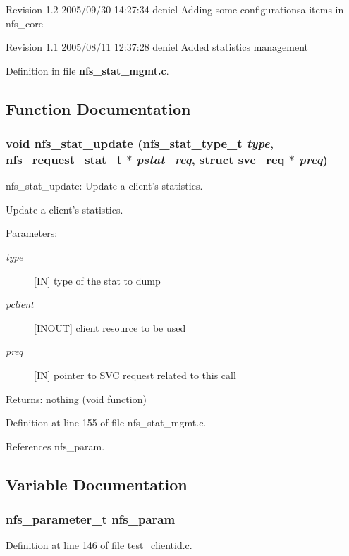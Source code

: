 Revision 1.2 2005/09/30 14:27:34 deniel Adding some configurationsa items in nfs\_\-core

Revision 1.1 2005/08/11 12:37:28 deniel Added statistics management

Definition in file {\bf nfs\_\-stat\_\-mgmt.c}.

\subsection{Function Documentation}
\subsubsection{\setlength{\rightskip}{0pt plus 5cm}void nfs\_\-stat\_\-update (nfs\_\-stat\_\-type\_\-t {\em type}, nfs\_\-request\_\-stat\_\-t $\ast$ {\em pstat\_\-req}, struct svc\_\-req $\ast$ {\em preq})}\label{nfs__stat__mgmt_8c_a1}


nfs\_\-stat\_\-update: Update a client's statistics.

Update a client's statistics.

\begin{Desc}
\item[Parameters:]
\begin{description}
\item[{\em type}][IN] type of the stat to dump \item[{\em pclient}][INOUT] client resource to be used \item[{\em preq}][IN] pointer to SVC request related to this call\end{description}
\end{Desc}
\begin{Desc}
\item[Returns:]nothing (void function) \end{Desc}


Definition at line 155 of file nfs\_\-stat\_\-mgmt.c.

References nfs\_\-param.

\subsection{Variable Documentation}
\subsubsection{\setlength{\rightskip}{0pt plus 5cm}nfs\_\-parameter\_\-t {\bf nfs\_\-param}}\label{nfs__stat__mgmt_8c_a0}




Definition at line 146 of file test\_\-clientid.c.